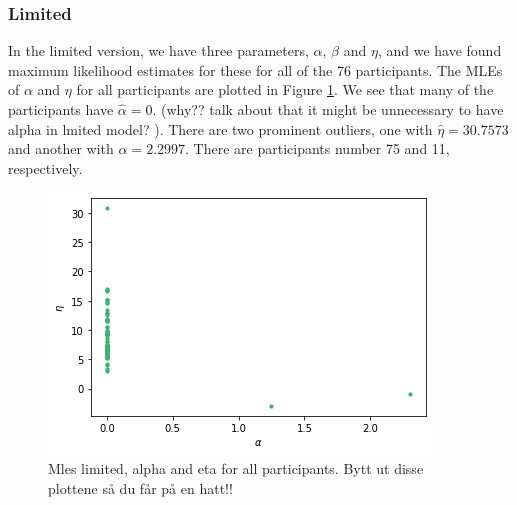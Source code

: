 \subsubsection{Limited}
In the limited version, we have three parameters, $\alpha$, $\beta$ and $\eta$, and we have found maximum likelihood estimates for these for all of the 76 participants. The MLEs of $\alpha$ and $\eta$ for all participants are plotted in Figure \ref{fig:mles_limited_alpha_eta}. We see that many of the participants have $\hat{\alpha}=0$. (why?? talk about that it might be unnecessary to have alpha in lmited model? ). 
There are two prominent outliers, one with $\hat{\eta}=30.7573$ and another with $\hat{\alpha}=2.2997$. There are participants number 75 and 11, respectively. 
\begin{figure}
    \centering
    \includegraphics[scale=0.7]{pictures/plotted_mles_limited_alpha_eta_gk1.png}
    \caption{Mles limited, alpha and eta for all participants. Bytt ut disse plottene så du får på en hatt!!}
    \label{fig:mles_limited_alpha_eta}
\end{figure}

